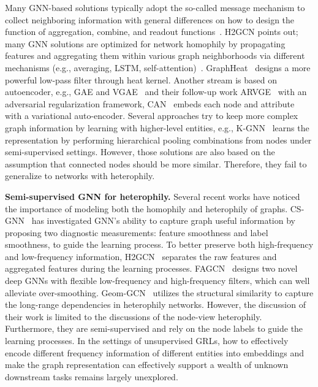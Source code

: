 \documentclass[10pt,journal,compsoc]{IEEEtran}
\begin{document}
Many GNN-based solutions typically adopt the so-called message mechanism to collect neighboring information with general differences on how to design the function of aggregation, combine, and readout functions~\cite{Xu18_gin}. H2GCN\cite{Zhu2020} points out; many GNN solutions are optimized for network homophily by propagating features and aggregating them within various graph neighborhoods via different mechanisms (e.g., averaging, LSTM, self-attention)~\cite{Kipf16,hamilton_grapshsage, Veli17_GAT, hou2019representation}. GraphHeat~\cite{xu2020graph} designs a more powerful low-pass filter through heat kernel. Another stream is based on autoencoder, e.g., GAE and VGAE~\cite{GAE16} and their follow-up work ARVGE~\cite {ARGA18} with an adversarial regularization framework, CAN~\cite{meng2019co} embeds
each node and attribute with a variational auto-encoder. Several approaches try to keep more complex graph information by learning with higher-level entities, e.g., K-GNN~\cite{123gnn19} learns the representation by performing hierarchical pooling combinations from nodes under semi-supervised settings. However, those solutions are also based on the assumption that connected nodes should be more similar. Therefore, they fail to generalize to networks with heterophily.



\noindent\textbf{Semi-supervised GNN for heterophily.} Several recent works have noticed the importance of modeling both the homophily and heterophily of graphs. CS-GNN~\cite{Hou20Measuring} has investigated GNN’s ability to capture graph useful information by proposing two diagnostic measurements: feature smoothness and label smoothness, to guide the learning process. To better preserve both high-frequency and low-frequency information, H2GCN~\cite{Zhu2020} separates the raw features and aggregated features during the learning processes. FAGCN~\cite{Zhu21,bo21} designs two novel deep GNNs with flexible low-frequency and high-frequency filters, which can well alleviate over-smoothing. Geom-GCN~\cite{pei2020geom} utilizes the structural similarity to capture the long-range dependencies in heterophily networks. However, the discussion of their work is limited to the discussions of the node-view heterophily. Furthermore, they are semi-supervised and rely on the node labels to guide the learning processes. In the settings of unsupervised GRLs, how to effectively encode different frequency information of different entities into embeddings and make the graph representation can effectively support a wealth of unknown downstream tasks remains largely unexplored.  
\end{document}
